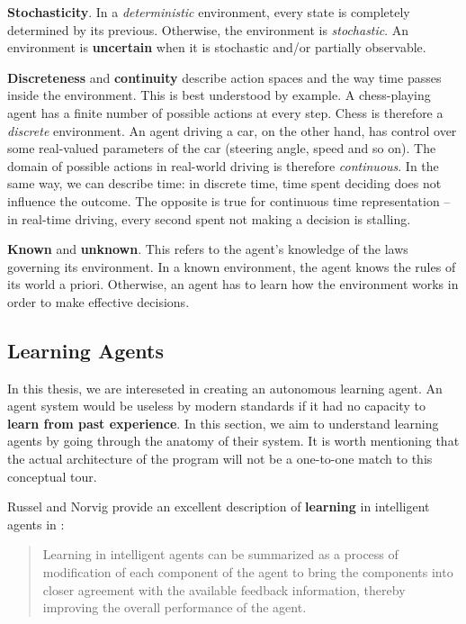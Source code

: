 \textbf{Stochasticity}.
In a \emph{deterministic} environment, every state is completely determined by its previous. Otherwise, the environment is \emph{stochastic}. An environment is \textbf{uncertain} when it is stochastic and/or partially observable.

\textbf{Discreteness} and \textbf{continuity} describe action spaces and the way time passes inside the environment.
This is best understood by example.
A chess-playing agent has a finite number of possible actions at every step.
Chess is therefore a \emph{discrete} environment.
An agent driving a car, on the other hand, has control over some real-valued parameters of the car (steering angle, speed and so on).
The domain of possible actions in real-world driving is therefore \emph{continuous}.
In the same way, we can describe time: in discrete time, time spent deciding does not influence the outcome. The opposite is true for continuous time representation -- in real-time driving, every second spent not making a decision is stalling.

\textbf{Known} and \textbf{unknown}.
This refers to the agent's knowledge of the laws governing its environment. In a known environment, the agent knows the rules of its world a priori. Otherwise, an agent has to learn how the environment works in order to make effective decisions.


\subsection{Learning Agents} \label{learning-agents}
In this thesis, we are intereseted in creating an autonomous learning agent.
An agent system would be useless by modern standards if it had no capacity to \textbf{learn from past experience}.
In this section, we aim to understand learning agents by going through the anatomy of their system.
It is worth mentioning that the actual architecture of the program will not be a one-to-one match to this conceptual tour.

Russel and Norvig provide an excellent description of \textbf{learning} in intelligent agents in \cite{aima}:
\begin{quote}
    Learning in intelligent agents can be summarized as a process of modification of each component of the agent to bring the components into closer agreement with the available feedback information, thereby improving the overall performance of the agent.
\end{quote}

